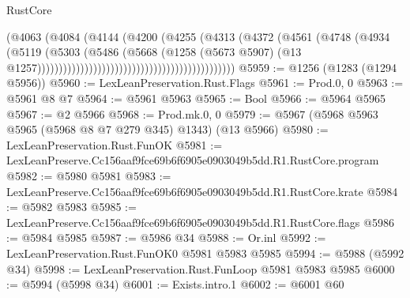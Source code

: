 \begin{lexlean}{RustCore}
\begin{coremodule}
                                                                (@4063
                                                                  (@4084
                                                                    (@4144
                                                                      (@4200
                                                                        (@4255
                                                                          (@4313
                                                                            (@4372
                                                                              (@4561
                                                                                (@4748
                                                                                  (@4934
                                                                                    (@5119
                                                                                      (@5303
                                                                                        (@5486
                                                                                          (@5668
                                                                                            (@1258
                                                                                              (@5673
                                                                                                @5907)
                                                                                              (@13
                                                                                                @1257))))))))))))))))))))))))))))))))))))))))))))))
@5959 := @1256 (@1283 (@1294 @5956))
@5960 := LexLeanPreservation.Rust.Flags
@5961 := Prod.{0, 0}
@5963 := @5961 @8 @7
@5964 := @5961 @5963
@5965 := Bool
@5966 := @5964 @5965
@5967 := @2 @5966
@5968 := Prod.mk.{0, 0}
@5979 := @5967 (@5968 @5963 @5965 (@5968 @8 @7 @279 @345) @1343) (@13 @5966)
@5980 := LexLeanPreservation.Rust.FunOK
@5981 := LexLeanPreserve.Cc156aaf9fce69b6f6905e0903049b5dd.R1.RustCore.program
@5982 := @5980 @5981
@5983 := LexLeanPreserve.Cc156aaf9fce69b6f6905e0903049b5dd.R1.RustCore.krate
@5984 := @5982 @5983
@5985 := LexLeanPreserve.Cc156aaf9fce69b6f6905e0903049b5dd.R1.RustCore.flags
@5986 := @5984 @5985
@5987 := @5986 @34
@5988 := Or.inl
@5992 := LexLeanPreservation.Rust.FunOK0 @5981 @5983 @5985
@5994 := @5988 (@5992 @34)
@5998 := LexLeanPreservation.Rust.FunLoop @5981 @5983 @5985
@6000 := @5994 (@5998 @34)
@6001 := Exists.intro.{1}
@6002 := @6001 @60

\end{coremodule}
\end{lexlean}
